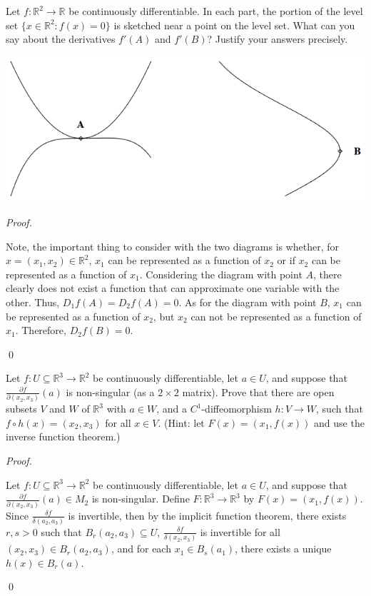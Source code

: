 \documentclass[12pt]{article}
\newenvironment{problem}[2][Problem]{\begin{trivlist}
\item[\hskip \labelsep {\bfseries #1}\hskip \labelsep {\bfseries #2.}]}{\end{trivlist}}
\newenvironment{sol}
    {\emph{Proof.}
    }
    {
    \qed
    }
\begin{document}
\begin{problem}{27}
Let $f : \mathbb{R}^2 \to \mathbb{R}$ be continuously differentiable. In each part, the portion of the level set $\{x \in \mathbb{R}^2 : f(x) = 0\}$ is sketched near a point on the level set. What can you say about the derivatives $f'(A)$ and $f'(B)$? Justify your answers precisely.

\begin{center}
    \includegraphics[scale=1]{473figure.PNG}
    \end{center}
    
    \begin{sol}
    Note, the important thing to consider with the two diagrams is whether, for $x = (x_1,x_2) \in \mathbb{R}^2$, $x_1$ can be represented as a function of $x_2$ or if $x_2$ can be represented as a function of $x_1$. Considering the diagram with point $A$, there clearly does not exist a function that can approximate one variable with the other. Thus, $D_1f(A) = D_2f(A) = 0$. As for the diagram with point $B$, $x_1$ can be represented as a function of $x_2$, but $x_2$ can not be represented as a function of $x_1$. Therefore, $D_2f(B) = 0$.
    \end{sol}
\end{problem}


\begin{problem}{28}
Let $f : U \subseteq \mathbb{R}^3 \to \mathbb{R}^2$ be continuously differentiable, let $a \in U$, and suppose that $\frac{\partial f}{\partial (x_2,x_3)}(a)$ is non-singular (as a $2 \times 2$ matrix). Prove that there are open subsets $V$ and $W$ of $\mathbb{R}^3$ with $a \in W$, and a $C^1$-diffeomorphism $h : V \to W$, such that $f \circ h(x) = (x_2, x_3)$ for all $x \in V$. (Hint: let $F(x) = (x_1,f(x))$ and use the inverse function theorem.)
\end{problem}

\begin{sol}
Let $f : U \subseteq \mathbb{R}^3 \to \mathbb{R}^2$ be continuously differentiable, let $a \in U$, and suppose that $\frac{\partial f}{\partial (x_2,x_3)}(a) \in M_2$ is non-singular. Define $F : \mathbb{R}^3 \to \mathbb{R}^3$ by $F(x) = (x_1,f(x))$. Since $\frac{\delta f}{\delta (a_2,a_3)}$ is invertible, then by the implicit function theorem, there exists $r,s > 0$ such that $B_r(a_2,a_3) \subseteq U$, $\frac{\delta f}{\delta (x_2,x_3)}$ is invertible for all $(x_2,x_3) \in B_r(a_2,a_3)$, and for each $x_1 \in B_s(a_1)$, there exists a unique $h(x) \in B_r(a)$.
\end{sol}



\end{document}
